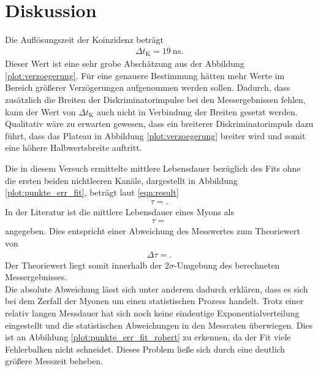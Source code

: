 \section{Diskussion}
\label{sec:Diskussion}

Die Auflösungszeit der Koinzidenz beträgt
\begin{align*}
  \Delta t_\text{K} = \SI{19}{\nano\second}.
\end{align*}
Dieser Wert ist eine sehr grobe Abschätzung aus der Abbildung \ref{plot:verzoegerung}.
Für eine genauere Bestimmung hätten mehr Werte im Bereich größerer Verzögerungen aufgenommen werden sollen.
Dadurch, dass zusätzlich die Breiten der Diskriminatorimpulse bei den Messergebnissen fehlen, kann der Wert von $\Delta t_\text{K}$ auch nicht in Verbindung der Breiten gesetzt werden.
Qualitativ wäre zu erwarten gewesen, dass ein breiterer Diskriminatorimpuls dazu führt, dass das Plateau in Abbildung \ref{plot:verzoegerung} breiter wird und somit eine höhere Halbwertsbreite auftritt. %

Die in diesem Versuch ermittelte mittlere Lebensdauer bezüglich des Fits ohne die ersten beiden nichtleeren Kanäle, dargestellt in Abbildung \ref{plot:punkte_err_fit}, beträgt laut \eqref{eqn:result}
\begin{align*}
  \tau = .
\end{align*}
In der Literatur \cite{Agashe:2014kda} ist die mittlere Lebensdauer eines Myons als
\begin{align*}
  \tau = 
\end{align*}
angegeben.
Dies entspricht einer Abweichung des Messwertes zum Theoriewert von
\begin{align*}
  \Delta \tau = .
\end{align*}
Der Theoriewert liegt somit innerhalb der $2\sigma$-Umgebung des berechneten Messergebnisses.\\
Die absolute Abweichung lässt sich unter anderem dadurch erklären, dass es sich bei dem Zerfall der Myonen um einen statistischen Prozess handelt.
Trotz einer relativ langen Messdauer hat sich noch keine eindeutige Exponentialverteilung eingestellt und die statistischen Abweichungen in den Messraten überwiegen.
Dies ist an Abbildung \ref{plot:punkte_err_fit_robert} zu erkennen, da der Fit viele Fehlerbalken nicht schneidet.
Dieses Problem ließe sich durch eine deutlich größere Messzeit beheben.\\

